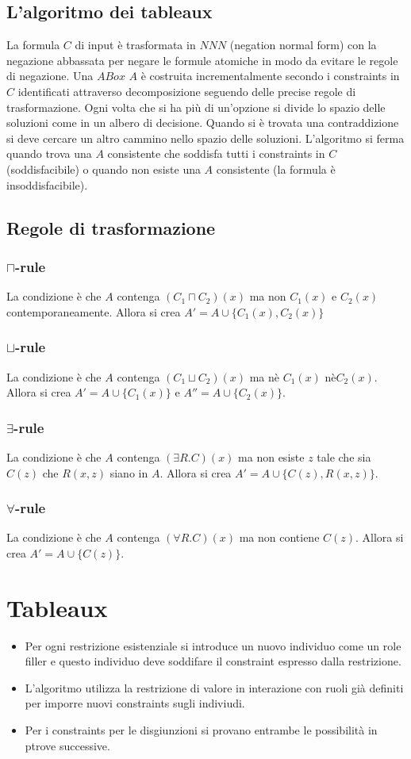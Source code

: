 \subsection{L'algoritmo dei tableaux}
La formula $C$ di input \`e trasformata in $NNN$ (negation normal form) con la negazione abbassata per negare le formule atomiche in modo da evitare le regole di negazione. Una $ABox$ $A$ \`e costruita
incrementalmente secondo i constraints in $C$ identificati attraverso decomposizione seguendo delle precise regole di trasformazione. Ogni volta che si ha pi\`u di un'opzione si divide lo spazio delle soluzioni
come in un albero di decisione. Quando si \`e trovata una contraddizione si deve cercare un altro cammino nello spazio delle soluzioni. L'algoritmo si ferma quando trova una $A$ consistente che soddisfa tutti i
constraints in $C$ (soddisfacibile) o quando non esiste una $A$ consistente (la formula \`e insoddisfacibile).
\subsection{Regole di trasformazione}
\subsubsection{$\mathbf{\sqcap}$-rule}
La condizione \`e che $A$ contenga $(C_1\sqcap C_2)(x)$ ma non $C_1(x)$ e $C_2(x)$ contemporaneamente. Allora si crea $A'=A\cup\{C_1(x), C_2(x)\}$
\subsubsection{$\mathbf{\sqcup}$-rule}
La condizione \`e che $A$ contenga $(C_1\sqcup C_2)(x)$ ma n\`e $C_1(x)$ n\`e$C_2(x)$. Allora si crea $A'=A\cup\{C_1(x)\}$ e $A''=A\cup\{C_2(x)\}$.
\subsubsection{$\mathbf{\exists}$-rule}
La condizione \`e che $A$ contenga $(\exists R.C)(x)$ ma non esiste $z$ tale che sia $C(z)$ che $R(x,z)$ siano in $A$. Allora si crea $A'=A\cup\{C(z), R(x,z)\}$.
\subsubsection{$\mathbf{\forall}$-rule}
La condizione \`e che $A$ contenga $(\forall R.C)(x)$ ma non contiene $C(z)$. Allora si crea $A'=A\cup\{C(z)\}$.
\section{Tableaux}
\begin{itemize}
\item Per ogni restrizione esistenziale si introduce un nuovo individuo come un role filler e questo individuo deve soddifare il constraint espresso dalla restrizione.
\item L'algoritmo utilizza la restrizione di valore in interazione con ruoli gi\`a definiti per imporre nuovi constraints sugli indiviudi.
\item Per i constraints per le disgiunzioni si provano entrambe le possibilit\`a in ptrove successive.
\end{itemize}